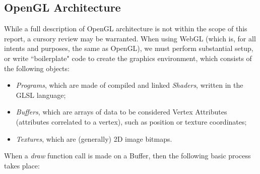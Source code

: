 \subsection{OpenGL Architecture}
While a full description of OpenGL architecture is not within the scope of this report, a cursory review may be warranted. When using WebGL (which is, for all intents and purposes, the same as OpenGL), we must perform substantial setup, or write ``boilerplate" code to create the graphics environment, which consists of the following objects:\cite{opengles2}
\begin{itemize}
    \item \emph{Programs}, which are made of compiled and linked \emph{Shaders}, written in the GLSL language;
    \item \emph{Buffers}, which are arrays of data to be considered Vertex Attributes (attributes correlated to a vertex), such as position or texture coordinates;
    \item \emph{Textures}, which are (generally) 2D image bitmaps.
\end{itemize}
\par When a \emph{draw} function call is made on a Buffer, then the following basic process takes place:
